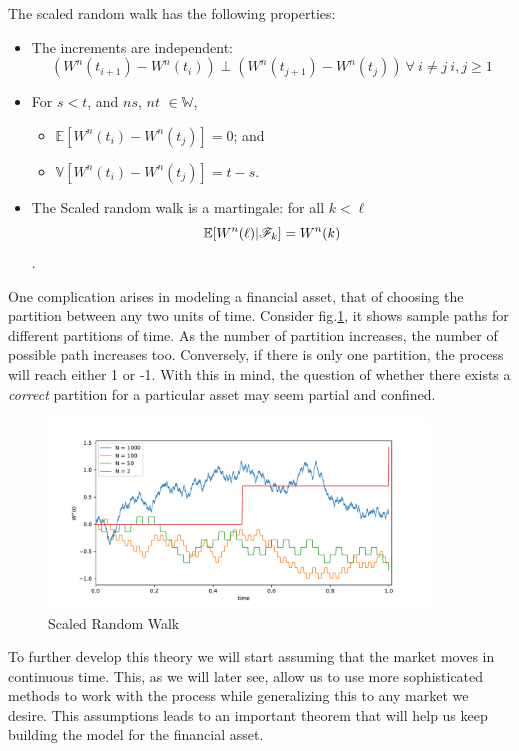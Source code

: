 \documentclass[../TGMAFFIRO]{subfiles}
\begin{document}
\begin{remark}
	The scaled random walk has the following properties:
	\begin{itemize}
		\item The increments are independent: \[\left(W^n(t_{i+1}) - W^n(t_{i})\right) \perp \left(W^n(t_{j+1}) - W^n(t_{j})\right) \ \forall \ i \neq j \ i, j \geq 1\]
		\item For $s < t$, and $ns$,  $nt$ $\in \mathbb{W}$, 
		\begin{itemize}
			\item $\mathbb{E}[W^n(t_{i}) - W^n(t_{j})] = 0$; and
			\item $\mathbb{V}[W^n(t_{i}) - W^n(t_{j})] = t - s$.
		\end{itemize}
		\item The Scaled random walk is a martingale: for all $k < \ell$
		\[\mathbb{E}[W^n(\ell) | \mathscr{F}_k] = W^n(k)\].
	\end{itemize}
\end{remark}

One complication arises in modeling a financial asset, that of choosing the partition between any two units of time. Consider fig.\ref{fig:scaled_random_walk}, it shows sample paths for different partitions of time. As the number of partition increases, the number of possible path increases too. Conversely, if there is only one partition, the process will reach either 1 or -1. With this in mind, the question of whether there exists a \textit{correct} partition for a particular asset may seem partial and confined.\\

\begin{figure}[h]
	\label{fig:scaled_random_walk}
	\centering
	\includegraphics[width=0.9\textwidth]{../images/scaled_random_walk}
	\caption{Scaled Random Walk}
\end{figure}


To further develop this theory we will start assuming that the market moves in continuous time. This, as we will later see, allow us to use more sophisticated methods to work with the process while generalizing this to any market we desire. This assumptions leads to an important theorem that will help us keep building the model for the financial asset.
\end{document}

